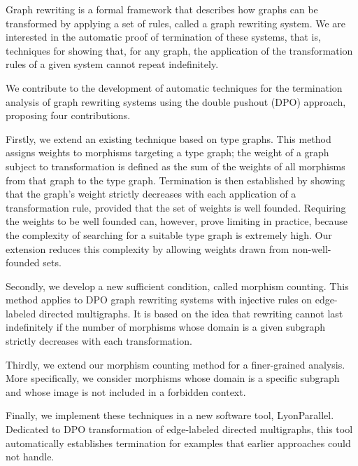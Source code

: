 Graph rewriting is a formal framework that describes how graphs can be transformed by applying a set of rules, called a graph rewriting system. We are interested in the automatic proof of termination of these systems, that is, techniques for showing that, for any graph, the application of the transformation rules of a given system cannot repeat indefinitely.

We contribute to the development of automatic techniques for the termination analysis of graph rewriting systems using the double pushout (DPO) approach, proposing four contributions.

Firstly, we extend an existing technique based on type graphs. This method assigns weights to morphisms targeting a type graph; the weight of a graph subject to transformation is defined as the sum of the weights of all morphisms from that graph to the type graph. Termination is then established by showing that the graph's weight strictly decreases with each application of a transformation rule, provided that the set of weights is well founded. Requiring the weights to be well founded can, however, prove limiting in practice, because the complexity of searching for a suitable type graph is extremely high. Our extension reduces this complexity by allowing weights drawn from non-well-founded sets. 

Secondly, we develop a new sufficient condition, called morphism counting. This method applies to DPO graph rewriting systems with injective rules on edge-labeled directed multigraphs. It is based on the idea that rewriting cannot last indefinitely if the number of morphisms whose domain is a given subgraph strictly decreases with each transformation.

Thirdly, we extend our morphism counting method for a finer-grained analysis. More specifically, we consider morphisms whose domain is a specific subgraph and whose image is not included in a forbidden context.

Finally, we implement these techniques in a new software tool, LyonParallel. Dedicated to DPO transformation of edge-labeled directed multigraphs, this tool automatically establishes termination for examples that earlier approaches could not handle.